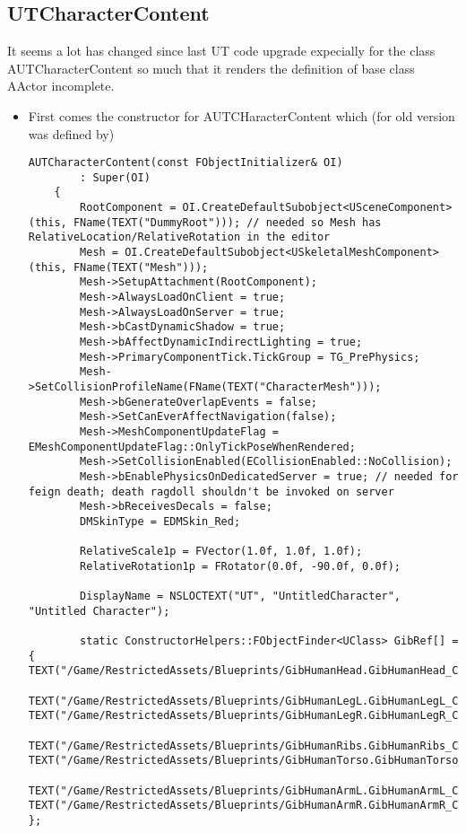 \documentclass{article}
\begin{document}
\subsection{UTCharacterContent}
It seems a lot has changed since last UT code upgrade expecially for the class {\color{classcolor}AUTCharacterContent} so much that it renders the definition of base class {\color{classcolor}AActor} incomplete.
\begin{itemize}
\item First comes the constructor
for {\color{classcolor}AUTCHaracterContent} which (for old version was defined by)
\lstset{language=c++}
\begin{lstlisting}[frame=single]
    AUTCharacterContent(const FObjectInitializer& OI)
		: Super(OI)
	{
		RootComponent = OI.CreateDefaultSubobject<USceneComponent>(this, FName(TEXT("DummyRoot"))); // needed so Mesh has RelativeLocation/RelativeRotation in the editor
		Mesh = OI.CreateDefaultSubobject<USkeletalMeshComponent>(this, FName(TEXT("Mesh")));
		Mesh->SetupAttachment(RootComponent);
		Mesh->AlwaysLoadOnClient = true;
		Mesh->AlwaysLoadOnServer = true;
		Mesh->bCastDynamicShadow = true;
		Mesh->bAffectDynamicIndirectLighting = true;
		Mesh->PrimaryComponentTick.TickGroup = TG_PrePhysics;
		Mesh->SetCollisionProfileName(FName(TEXT("CharacterMesh")));
		Mesh->bGenerateOverlapEvents = false;
		Mesh->SetCanEverAffectNavigation(false);
		Mesh->MeshComponentUpdateFlag = EMeshComponentUpdateFlag::OnlyTickPoseWhenRendered;
		Mesh->SetCollisionEnabled(ECollisionEnabled::NoCollision);
		Mesh->bEnablePhysicsOnDedicatedServer = true; // needed for feign death; death ragdoll shouldn't be invoked on server
		Mesh->bReceivesDecals = false;
		DMSkinType = EDMSkin_Red;

		RelativeScale1p = FVector(1.0f, 1.0f, 1.0f);
		RelativeRotation1p = FRotator(0.0f, -90.0f, 0.0f);

		DisplayName = NSLOCTEXT("UT", "UntitledCharacter", "Untitled Character");

		static ConstructorHelpers::FObjectFinder<UClass> GibRef[] = { TEXT("/Game/RestrictedAssets/Blueprints/GibHumanHead.GibHumanHead_C"), 
			TEXT("/Game/RestrictedAssets/Blueprints/GibHumanLegL.GibHumanLegL_C"), TEXT("/Game/RestrictedAssets/Blueprints/GibHumanLegR.GibHumanLegR_C"),
			TEXT("/Game/RestrictedAssets/Blueprints/GibHumanRibs.GibHumanRibs_C"), TEXT("/Game/RestrictedAssets/Blueprints/GibHumanTorso.GibHumanTorso_C"),
			TEXT("/Game/RestrictedAssets/Blueprints/GibHumanArmL.GibHumanArmL_C"), TEXT("/Game/RestrictedAssets/Blueprints/GibHumanArmR.GibHumanArmR_C") };


\end{lstlisting}
\end{itemize}
\end{document}
